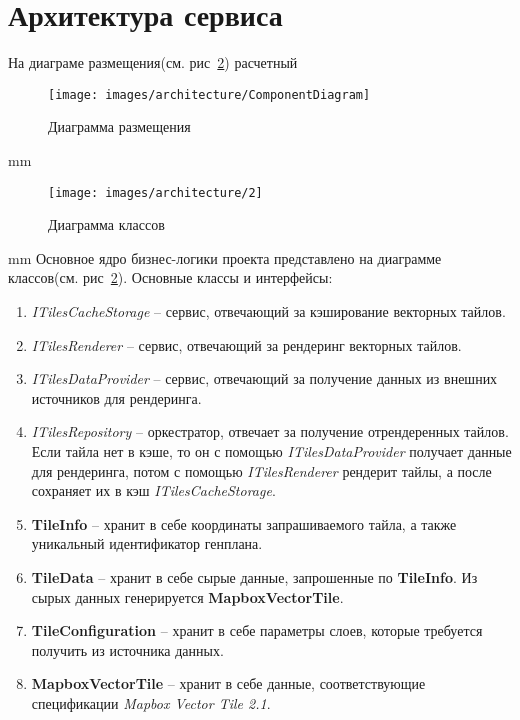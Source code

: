 \section*{\large{Архитектура сервиса}}

На диаграме размещения(см. рис\ \ref{pic:architecture__classes-diagram}) расчетный
\begin{figure}[H]
	\hspace*{-1 cm}\texttt{[image: images/architecture/ComponentDiagram]}
	\caption{Диаграмма размещения}
	\label{pic:architecture__deployment-diagram}
\end{figure}
 mm




\begin{figure}[H]
	\hspace*{-2.5 cm}\texttt{[image: images/architecture/2]}
	\caption{Диаграмма классов}
	\label{pic:architecture__classes-diagram}
\end{figure}
 mm
Основное ядро бизнес-логики проекта представлено на диаграмме классов(см. рис\ \ref{pic:architecture__classes-diagram}).
Основные классы и интерфейсы:
\begin{enumerate}
	\item \textit{ITilesCacheStorage} -- сервис, отвечающий за кэширование векторных тайлов.
	\item \textit{ITilesRenderer} -- сервис, отвечающий за рендеринг векторных тайлов.
	\item \textit{ITilesDataProvider} -- сервис, отвечающий за получение данных из внешних источников для рендеринга.
	\item \textit{ITilesRepository} -- оркестратор, отвечает за получение отрендеренных тайлов.
	Если тайла нет в кэше, то он с помощью \textit{ITilesDataProvider} получает данные для рендеринга, потом
	с помощью \textit{ITilesRenderer} рендерит тайлы, а после сохраняет их в кэш \textit{ITilesCacheStorage}.
	\item \textbf{TileInfo} -- хранит в себе координаты запрашиваемого тайла, а также уникальный идентификатор генплана.
	\item \textbf{TileData} -- хранит в себе сырые данные, запрошенные по \textbf{TileInfo}.
	Из сырых данных генерируется \textbf{MapboxVectorTile}.
	\item \textbf{TileConfiguration} -- хранит в себе параметры слоев, которые требуется получить из источника данных.
	\item \textbf{MapboxVectorTile} -- хранит в себе данные, соответствующие спецификации \textit{Mapbox Vector Tile 2.1}.
\end{enumerate}
